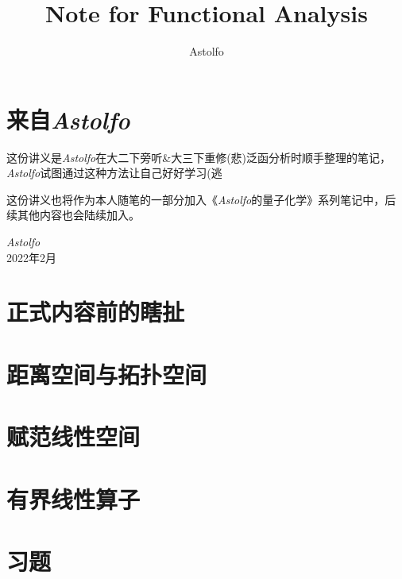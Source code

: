 \documentclass[lang=cn,10pt]{elegantbook}
\title{Note for Functional Analysis}
\author{Astolfo}
\begin{document}
\maketitle
\frontmatter


\mainmatter

\chapter*{来自\textit{Astolfo}}
\setcounter{page}{1}
这份讲义是\textit{Astolfo}在大二下旁听\&大三下重修(悲)泛函分析时顺手整理的笔记，\textit{Astolfo}试图通过这种方法让自己好好学习(逃

这份讲义也将作为本人随笔的一部分加入《\textit{Astolfo}的量子化学》系列笔记中，后续其他内容也会陆续加入。
\begin{flushright}
    \textit{Astolfo} \\ 2022年2月
\end{flushright}
\tableofcontents
\thispagestyle{empty}
\newpage
\setcounter{page}{1}
\chapter{正式内容前的瞎扯}

\chapter{距离空间与拓扑空间}

\chapter{赋范线性空间}

\chapter{有界线性算子}

\chapter{习题}

\end{document}
